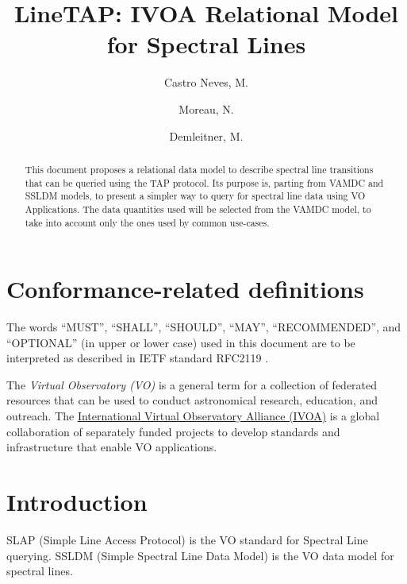 \documentclass[11pt,a4paper]{ivoa}
\title{LineTAP: IVOA Relational Model for Spectral Lines}
\author{Castro Neves, M.}
\author{Moreau, N.}
\author{Demleitner, M.}
\begin{document}
\begin{abstract}

This document proposes a relational data model to describe spectral line transitions 
that can be queried using the TAP protocol. Its purpose is, parting from VAMDC and SSLDM
models, to present a simpler way to query for spectral line data using VO Applications. The 
data quantities used will be selected from the VAMDC model, to take into account only 
the ones used by common use-cases.


\end{abstract}




\section*{Conformance-related definitions}

The words ``MUST'', ``SHALL'', ``SHOULD'', ``MAY'', ``RECOMMENDED'', and
``OPTIONAL'' (in upper or lower case) used in this document are to be
interpreted as described in IETF standard RFC2119 \citep{std:RFC2119}.

The \emph{Virtual Observatory (VO)} is a
general term for a collection of federated resources that can be used
to conduct astronomical research, education, and outreach.
The \href{http://www.ivoa.net}{International
Virtual Observatory Alliance (IVOA)} is a global
collaboration of separately funded projects to develop standards and
infrastructure that enable VO applications.


\section{Introduction}


SLAP (Simple Line Access Protocol)\citep{2010ivoa.specQ1209O} is the VO standard for 
Spectral Line querying. SSLDM (Simple Spectral Line Data 
Model)\citep{2010ivoa.spec.1209O} 
is the VO data model for spectral lines.
\end{document}
